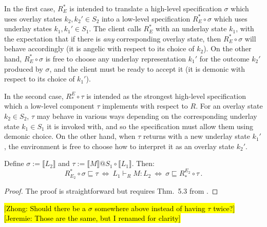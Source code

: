 \documentclass[sigplan,screen]{acmart}
\newcommand{\hlc}[2][yellow]{ {\sethlcolor{#1} \hl{#2}} }
\newcommand\zhong[1]{\hlc[yellow]{[Zhong: #1]}}
\newcommand\jk[1]{\hlc[pink]{[Jeremie: #1]}}
\begin{document}
In the first case,
$R^*_E$ is intended to translate
a high-level specification $\sigma$
which uses overlay states $k_2, k_2' \in S_2$
into a low-level specification $R^*_E \circ \sigma$
which uses underlay states
$k_1, k_1' \in S_1$.
The client calls $R^*_E$
with an underlay state $k_1$,
with the expectation that if there is \emph{any}
corresponding overlay state,
then $R^*_E \circ \sigma$ will behave accordingly
(it is angelic with respect to its choice of $k_2$).
On the other hand,
$R^*_E \circ \sigma$ is free to choose any underlay representation
$k_1'$
for the outcome $k_2'$ produced by $\sigma$,
and the client must be ready to accept it
(it is demonic with respect to its choice of $k_1'$).

In the second case,
$R_*^E \circ \tau$ is intended as
the strongest high-level specification
which a low-level component $\tau$ implements
with respect to $R$.
For an overlay state $k_2 \in S_2$,
$\tau$ may behave in various ways
depending on the corresponding underlay state $k_1 \in S_1$
it is invoked with,
and so the specification must allow them using demonic choice.
On the other hand,
when $\tau$ returns with a new underlay state $k_1'$,
the environment is free to choose
how to interpret it as an overlay state $k_2'$.


\begin{theorem}
Define
$\sigma := \llbracket L_2 \rrbracket$ and
$\tau := \llbracket M \rrbracket @ S_1 \circ \llbracket L_1 \rrbracket$.
Then:
\[
  R^*_{E_2} \!\circ \sigma \sqsubseteq \tau
  \: \Leftrightarrow \:
  L_1 \vdash_R M : L_2
  \: \Leftrightarrow \:
  \sigma \sqsubseteq R_*^{E_2} \!\circ \tau \,.
\]
\begin{proof}
The proof is straightforward but requires
Thm.~5.3 from \citet{dndf}.
\end{proof}
\end{theorem}

\zhong{Should there be a $\sigma$ somewhere above instead of having $\tau$ twice?}
\jk{Those are the same, but I renamed for clarity}

\end{document}

